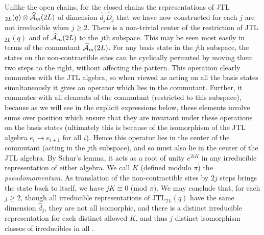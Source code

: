 \documentclass[twocolumn,floats,pra]{revtex4}
\def \hcA {\widehat{\cal A}}
\begin{document}
Unlike the open chains, for the closed chains the representations
of JTL$_{2L}(q)\otimes\hcA_m(2L)$ of dimension
$\widehat{d}_j\widehat{D}_j$ that we have now constructed for each
$j$ are not irreducible when $j\geq2$. There is a non-trivial
center of the restriction of JTL$_{2L}(q)$ and of $\hcA_m(2L)$ to
the $j$th subspace. This may be seen most easily in terms of the
commutant $\hcA_m(2L)$. For any basis state in the $j$th subspace,
the states on the non-contractible sites can be cyclically
permuted by moving them two steps to the right, without affecting
the pattern. This operation clearly commutes with the JTL algebra,
so when viewed as acting on all the basis states simultaneously it
gives an operator which lies in the commutant. Further, it
commutes with all elements of the commutant (restricted to this
subspace), because as we will see in the explicit expressions
below, these elements involve sums over position which ensure that
they are invariant under these operations on the basis states
(ultimately this is because of the isomorphism of the JTL algebra
$e_i\to e_{i+1}$ for all $i$). Hence this operator lies in the
center of the commutant (acting in the $j$th subspace), and so
must also lie in the center of the JTL algebra. By Schur's lemma,
it acts as a root of unity $e^{2iK}$ in any irreducible
representation of either algebra. We call $K$ (defined modulo
$\pi$) the {\em pseudomomentum}. As translation of the
non-contractible sites by $2j$ steps brings the state back to
itself, we have $jK\equiv0$ (mod $\pi$). We may conclude that, for
each $j\geq 2$, though all irreducible representations of
JTL$_{2L}(q)$ have the same dimension $\widehat{d}_j$, they are
not all isomorphic, and there is a distinct irreducible
representation for each distinct allowed $K$, and thus $j$
distinct isomorphism classes of irreducibles in all \cite{jones2}.
\end{document}
